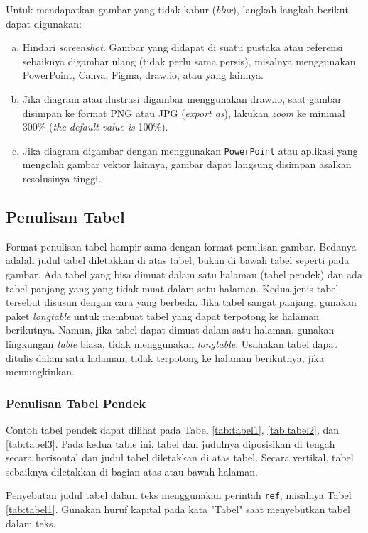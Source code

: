 Untuk mendapatkan gambar yang tidak kabur (\textit{blur}), langkah-langkah berikut dapat digunakan:
\begin{enumerate}[(a)]
\item Hindari \textit{screenshot}. Gambar yang didapat di suatu pustaka atau referensi sebaiknya digambar ulang (tidak perlu sama persis), misalnya menggunakan PowerPoint, Canva, Figma, draw.io, atau yang lainnya.
\item Jika diagram atau ilustrasi digambar menggunakan draw.io, saat gambar disimpan ke format PNG atau JPG (\textit{export as}), lakukan \textit{zoom} ke minimal 300\% (\textit{the default value is} 100\%). 
\item Jika diagram digambar dengan menggunakan \texttt{PowerPoint} atau aplikasi yang mengolah gambar vektor lainnya, gambar dapat langsung disimpan asalkan resolusinya tinggi.
\end{enumerate}

\subsection{Penulisan Tabel}
Format penulisan tabel hampir sama dengan format penulisan gambar. Bedanya adalah judul tabel diletakkan di atas tabel, bukan di bawah tabel seperti pada gambar.
Ada tabel yang bisa dimuat dalam satu halaman (tabel pendek) dan ada tabel panjang yang yang tidak muat dalam satu halaman. Kedua jenis tabel tersebut disusun dengan cara yang berbeda.
Jika tabel sangat panjang, gunakan paket \textit{longtable} untuk membuat tabel yang dapat terpotong ke halaman berikutnya.
Namun, jika tabel dapat dimuat dalam satu halaman, gunakan lingkungan \textit{table} biasa, tidak menggunakan \textit{longtable}.
Usahakan tabel dapat ditulis dalam satu halaman, tidak terpotong ke halaman berikutnya, jika memungkinkan.

\subsubsection{Penulisan Tabel Pendek}
Contoh tabel pendek dapat dilihat pada Tabel \ref{tab:tabel1}, \ref{tab:tabel2}, dan \ref{tab:tabel3}. 
Pada kedua table ini, tabel dan judulnya diposisikan di tengah secara horisontal dan 
judul tabel diletakkan di atas tabel. Secara vertikal, tabel sebaiknya diletakkan di bagian atas atau bawah halaman.

Penyebutan judul tabel dalam teks menggunakan perintah \texttt{ref}, misalnya Tabel \ref{tab:tabel1}.
Gunakan huruf kapital pada kata "Tabel" saat menyebutkan tabel dalam teks.

